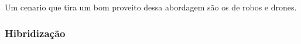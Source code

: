             Um cenario que tira um bom proveito dessa abordagem são os de robos e drones.            

        \subsubsection{Hibridização}



